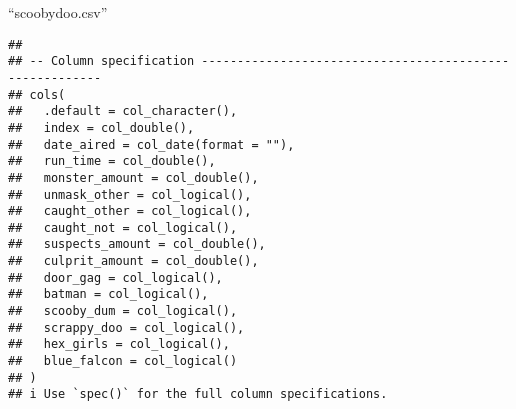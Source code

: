 \documentclass[
]{article}
\begin{document}
\pagebreak
[1]

``scoobydoo.csv''

\begin{verbatim}
## 
## -- Column specification --------------------------------------------------------
## cols(
##   .default = col_character(),
##   index = col_double(),
##   date_aired = col_date(format = ""),
##   run_time = col_double(),
##   monster_amount = col_double(),
##   unmask_other = col_logical(),
##   caught_other = col_logical(),
##   caught_not = col_logical(),
##   suspects_amount = col_double(),
##   culprit_amount = col_double(),
##   door_gag = col_logical(),
##   batman = col_logical(),
##   scooby_dum = col_logical(),
##   scrappy_doo = col_logical(),
##   hex_girls = col_logical(),
##   blue_falcon = col_logical()
## )
## i Use `spec()` for the full column specifications.
\end{verbatim}

\pagebreak
\end{document}
